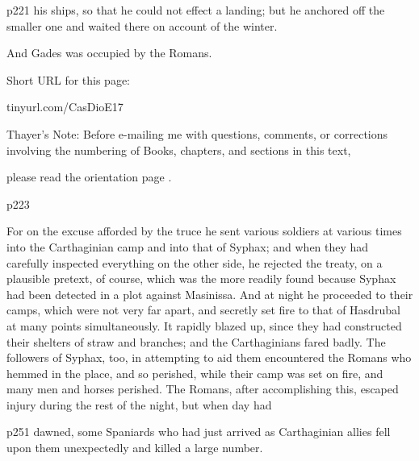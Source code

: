 p221 his ships, so that he could not effect a landing; but he anchored off the smaller one and waited there on account of the winter.

And Gades was occupied by the Romans.


Short URL for this page:

tinyurl.com/CasDioE17

Thayer's Note: Before e-mailing me with questions, comments, or corrections involving the numbering of Books, chapters, and sections in this text,

please read the orientation page .

p223

For on the excuse afforded by the truce he sent various soldiers at various times into the Carthaginian camp and into that of Syphax; and when they had carefully inspected everything on the other side, he rejected the treaty, on a plausible pretext, of course, which was the more readily found because Syphax had been detected in a plot against Masinissa. And at night he proceeded to their camps, which were not very far apart, and secretly set fire to that of Hasdrubal at many points simultaneously. It rapidly blazed up, since they had constructed their shelters of straw and branches; and the Carthaginians fared badly. The followers of Syphax, too, in attempting to aid them encountered the Romans who hemmed in the place, and so perished, while their camp was set on fire, and many men and horses perished. The Romans, after accomplishing this, escaped injury during the rest of the night, but when day had

p251 dawned, some Spaniards who had just arrived as Carthaginian allies fell upon them unexpectedly and killed a large number.

